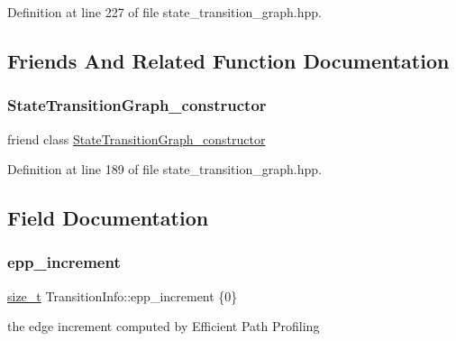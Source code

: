 Definition at line 227 of file state\+\_\+transition\+\_\+graph.\+hpp.



\subsection{Friends And Related Function Documentation}
\mbox{\label{classTransitionInfo_ad763807d92353814f2f1e7839d7eb408}} 
\subsubsection{\texorpdfstring{State\+Transition\+Graph\+\_\+constructor}{StateTransitionGraph\_constructor}}
{\footnotesize\ttfamily friend class \hyperlink{classStateTransitionGraph__constructor}{State\+Transition\+Graph\+\_\+constructor}\hspace{0.3cm}{\ttfamily [friend]}}



Definition at line 189 of file state\+\_\+transition\+\_\+graph.\+hpp.



\subsection{Field Documentation}
\mbox{\label{classTransitionInfo_a793e7ed8a189939607bf234495423db8}} 
\subsubsection{\texorpdfstring{epp\+\_\+increment}{epp\_increment}}
{\footnotesize\ttfamily \hyperlink{tutorial__fpt__2017_2intro_2sixth_2test_8c_a7c94ea6f8948649f8d181ae55911eeaf}{size\+\_\+t} Transition\+Info\+::epp\+\_\+increment \{0\}\hspace{0.3cm}{\ttfamily [private]}}



the edge increment computed by Efficient Path Profiling 



